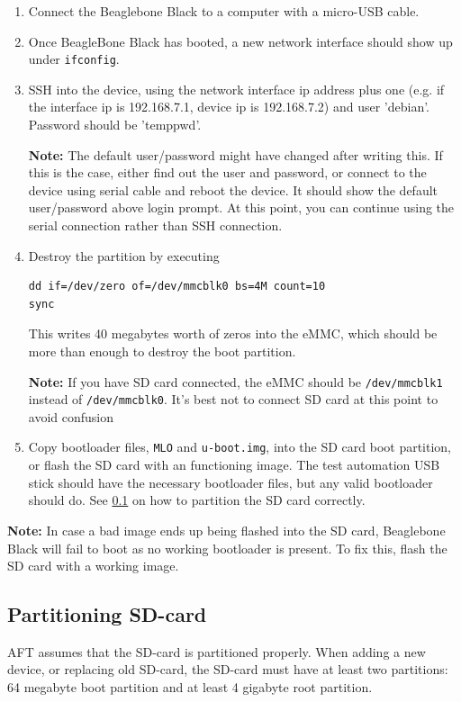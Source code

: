 \documentclass[a4paper,11pt]{article}
\newcommand{\note}{\textbf{Note: }}
\newcommand{\cmd}[1]{\texttt{#1}}
\begin{document}
\begin{enumerate}

\item Connect the Beaglebone Black to a computer with a micro-USB cable. 

\item Once BeagleBone Black has booted, a new network interface should show up under \cmd{ifconfig}.

\item SSH into the device, using the network interface ip address plus one (e.g. if the interface ip is 192.168.7.1, device ip is 192.168.7.2) and user 'debian'. Password should be 'temppwd'.

\note The default user/password might have changed after writing this. If this is the case, either find out the user and password, or connect to the device using serial cable and reboot the device. It should show the default user/password above login prompt. At this point, you can continue using the serial connection rather than SSH connection.

\item Destroy the partition by executing 

\begin{lstlisting}
dd if=/dev/zero of=/dev/mmcblk0 bs=4M count=10
sync
\end{lstlisting}

This writes 40 megabytes worth of zeros into the eMMC, which should be more than enough to destroy the boot partition.

\note If you have SD card connected, the eMMC should be \cmd{/dev/mmcblk1} instead of \cmd{/dev/mmcblk0}. It's best not to connect SD card at this point to avoid confusion

\item Copy bootloader files, \cmd{MLO} and \cmd{u-boot.img}, into the SD card boot partition, or flash the SD card with an functioning image. The test automation USB stick should have the necessary bootloader files, but any valid bootloader should do. See \ref{part_sd} on how to partition the SD card correctly.

\end{enumerate}

\note In case a bad image ends up being flashed into the SD card, Beaglebone Black will fail to boot as no working bootloader is present. To fix this, flash the SD card with a working image.

\subsection{Partitioning SD-card}
\label{part_sd}
AFT assumes that the SD-card is partitioned properly. When adding a new device, or replacing old SD-card, the SD-card must have at least two partitions: 64 megabyte boot partition and at least 4 gigabyte root partition.
\end{document}
